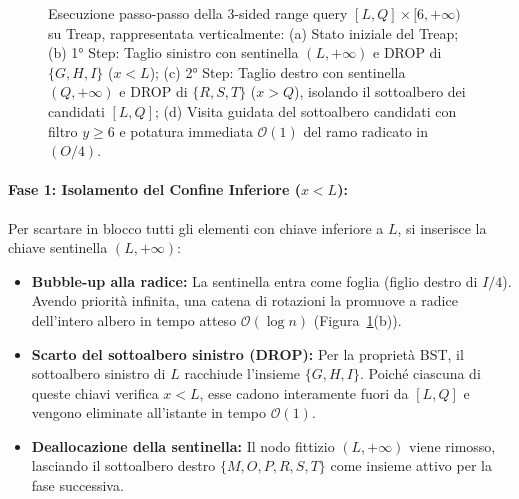 \begin{figure}[H]
{%
}
\caption{Esecuzione passo-passo della 3-sided range query $[L, Q] \times [6, +\infty)$ su Treap, rappresentata verticalmente: (a) Stato iniziale del Treap; (b) 1° Step: Taglio sinistro con sentinella $(L, +\infty)$ e DROP di $\{G, H, I\}$ ($x < L$); (c) 2° Step: Taglio destro con sentinella $(Q, +\infty)$ e DROP di $\{R, S, T\}$ ($x > Q$), isolando il sottoalbero dei candidati $[L, Q]$; (d) Visita guidata del sottoalbero candidati con filtro $y \ge 6$ e potatura immediata $\mathcal{O}(1)$ del ramo radicato in $(O / 4)$.}
\label{fig:3-sided-step-by-step-example}
\end{figure}

\paragraph{Fase 1: Isolamento del Confine Inferiore ($x < L$):}
Per scartare in blocco tutti gli elementi con chiave inferiore a $L$, si inserisce la chiave sentinella $(L, +\infty)$:
\begin{itemize}
    \item \textbf{Bubble-up alla radice:} La sentinella entra come foglia (figlio destro di $I / 4$). Avendo priorit\`a infinita, una catena di rotazioni la promuove a radice dell'intero albero in tempo atteso $\mathcal{O}(\log n)$ (Figura~\ref{fig:3-sided-step-by-step-example}(b)).
    \item \textbf{Scarto del sottoalbero sinistro (DROP):} Per la propriet\`a BST, il sottoalbero sinistro di $L$ racchiude l'insieme $\{G, H, I\}$. Poich\'e ciascuna di queste chiavi verifica $x < L$, esse cadono interamente fuori da $[L, Q]$ e vengono eliminate all'istante in tempo $\mathcal{O}(1)$.
    \item \textbf{Deallocazione della sentinella:} Il nodo fittizio $(L, +\infty)$ viene rimosso, lasciando il sottoalbero destro $\{M, O, P, R, S, T\}$ come insieme attivo per la fase successiva.
\end{itemize}


